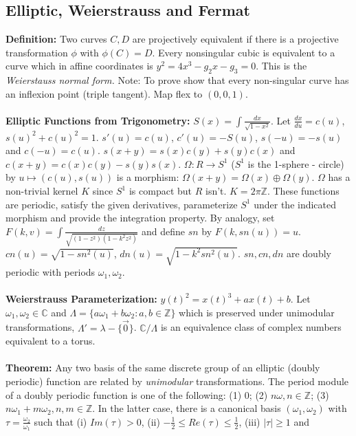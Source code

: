 \subsection {Elliptic, Weierstrauss and Fermat} 
{\bf Definition:} 
Two curves $C, D$ are projectively equivalent if there is a projective
transformation $\phi$ with $\phi(C)=D$.
Every nonsingular cubic is equivalent to a curve which in affine coordinates is
$y^2= 4 x^3-g_2x-g_3= 0$.  This is the \emph{Weierstauss normal form.}
Note: To prove show that every non-singular curve has an inflexion point (triple tangent).
Map flex to $(0,0,1)$.
\\
\\
{\bf Elliptic Functions from Trigonometry:}
$S(x)= \int {\frac {dx} {\sqrt {1- x^2}}}$.
Let ${\frac {dx} {du}}= c(u)$,
$s(u)^2 + c(u)^2= 1$.  $s'(u)= c(u)$, $c'(u)=-S(u)$, $s(-u)=-s(u)$ and $c(-u)=c(u)$.
$s(x+y)= s(x)c(y)+s(y)c(x)$ and
$c(x+y)= c(x)c(y)-s(y)s(x)$. $\Omega: R \rightarrow S^1$ ($S^1$ is the 1-sphere - circle) by
$u \mapsto (c(u),s(u))$ is a morphism: $\Omega(x+y)= \Omega (x) \oplus \Omega (y)$.
$\Omega$ has a non-trivial kernel $K$ since $S^1$ is compact but $R$ isn't.  
$K= 2 \pi {\mathbb Z}$.
These functions are periodic, satisfy the given derivatives, parameterize $S^1$ under the
indicated morphism and provide the integration property.
By analogy, set $F(k,v)= \int {\frac {dz} {\sqrt {(1-z^2 ) (1- k^2 z^2 )}}}$ and define
$sn$ by $F(k,sn(u))=u$.  
$cn(u)= {\sqrt {1 - sn^2 (u)}}$,
$dn(u)= {\sqrt {1 - k^2 sn^2 (u)}}$.  $sn, cn, dn$ are doubly periodic with
periods $\omega_1 , \omega_2$.  
\\
\\
{\bf Weierstrauss Parameterization:} $y(t)^2= x(t)^3+a x(t) + b$.
Let $\omega_1 , \omega_2 \in {\mathbb C}$ and 
$\Lambda= \{ a \omega_1 + b \omega_2: a,b \in {\mathbb Z} \}$ which
is preserved under unimodular transformations,
$\Lambda'= \lambda - \{ {\vec 0} \}$.
${\mathbb C}/\Lambda$ is an equivalence class of complex numbers equivalent
to a torus.
\\
\\
{\bf Theorem:}
Any two basis of the same discrete group of an elliptic (doubly periodic)
function are related by \emph{unimodular} transformations.
The period module of a doubly periodic function is one of the following: (1) $0$;
(2) $n \omega, n \in {\mathbb Z}$;
(3) $n \omega_1+ m \omega_2, n,m \in {\mathbb Z}$.  In the latter case, there is a 
canonical basis $(\omega_1 , \omega_2 )$ with $\tau= {\frac {\omega_2} {\omega_1}}$ such that
(i) $Im(\tau) >0$, (ii) $-{\frac 1 2} \leq Re(\tau) \leq {\frac 1 2}$, (iii) $|\tau| \geq 1$ and
